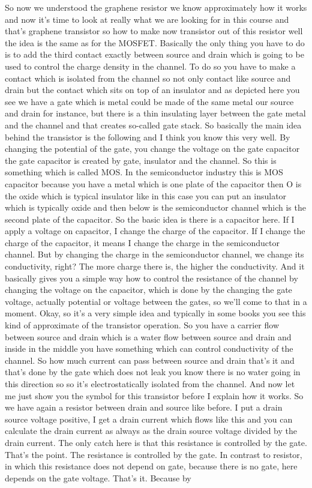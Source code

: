 So now we understood the graphene resistor we know approximately how it works and now it's time to look at really what we are looking for in this course and that's graphene transistor so how to make now transistor out of this resistor well the idea is the same as for the MOSFET. Basically the only thing you have to do is to add the third contact exactly between source and drain which is going to be used to control the charge density in the channel. To do so you have to make a contact which is isolated from the channel so not only contact like source and drain but the contact which sits on top of an insulator and as depicted here you see we have a gate which is metal could be made of the same metal our source and drain for instance, but there is a thin insulating layer between the gate metal and the channel and that creates so-called gate stack. So basically the main idea behind the transistor is the following and I think you know this very well. By changing the potential of the gate, you change the voltage on the gate capacitor the gate capacitor is created by gate, insulator and the channel. So this is something which is called MOS. In the semiconductor industry this is MOS capacitor because you have a metal which is one plate of the capacitor then O is the oxide which is typical insulator like in this case you can put an insulator which is typically oxide and then below is the semiconductor channel which is the second plate of the capacitor. So the basic idea is there is a capacitor here. If I apply a voltage on capacitor, I change the charge of the capacitor. If I change the charge of the capacitor, it means I change the charge in the semiconductor channel. But by changing the charge in the semiconductor channel, we change its conductivity, right? The more charge there is, the higher the conductivity. And it basically gives you a simple way how to control the resistance of the channel by changing the voltage on the capacitor, which is done by the changing the gate voltage, actually potential or voltage between the gates, so we'll come to that in a moment. Okay, so it's a very simple idea and typically in some books you see this kind of approximate of the transistor operation. So you have a carrier flow between source and drain which is a water flow between source and drain and inside in the middle you have something which can control conductivity of the channel. So how much current can pass between source and drain that's it and that's done by the gate which does not leak you know there is no water going in this direction so so it's electrostatically isolated from the channel. And now let me just show you the symbol for this transistor before I explain how it works. So we have again a resistor between drain and source like before. I put a drain source voltage positive, I get a drain current which flows like this and you can calculate the drain current as always as the drain source voltage divided by the drain current. The only catch here is that this resistance is controlled by the gate. That's the point. The resistance is controlled by the gate. In contrast to resistor, in which this resistance does not depend on gate, because there is no gate, here depends on the gate voltage. That's it. Because by 